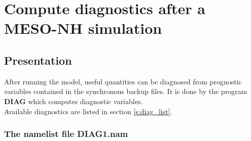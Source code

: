 \chapter{Compute diagnostics after a MESO-NH simulation} \label{ch:diag}
\section{Presentation}

After running the model, useful quantities can be diagnosed from
prognostic variables contained in the synchronous backup files. It is done by
the program {\bf DIAG} which computes diagnostic variables.\\

\noindent Available diagnostics are listed in section \ref{s:diag_list}.\\

\subsection{The namelist file DIAG1.nam } \label{ss:diag_nam}

